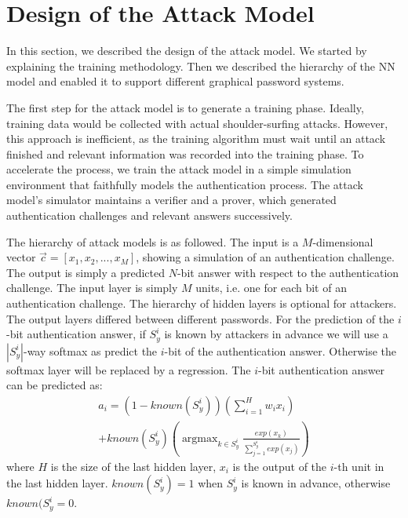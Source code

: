 \documentclass{article}
\begin{document}
  
  \section{Design of the Attack Model}
  \label{sec:design}
  In this section, we described the design of the attack model. We started by explaining the training 
  methodology. Then we described the hierarchy of the NN model and enabled it to support different graphical 
  password systems.
  
  The first step for the attack model is to generate a training phase. Ideally, training data would be collected with actual 
  shoulder-surfing attacks. However, this approach is inefficient, as the training algorithm must wait until an attack 
  finished and relevant information was recorded into the training phase. To accelerate the process, we train 
  the attack model in a simple simulation environment that faithfully models the authentication process. The 
  attack model's simulator maintains a verifier and a prover, which generated authentication challenges and 
  relevant answers successively.
  
  The hierarchy of attack models is as followed. The input is a $M$-dimensional vector 
  $\vec c = [x_1, x_2,...,x_M]$, showing a simulation of an authentication challenge. The output is simply a 
  predicted $N$-bit answer with respect to the authentication challenge. The input layer is simply $M$ units, 
  i.e. one for each bit of an authentication challenge. The hierarchy of hidden layers is optional for 
  attackers. The output layers differed between different passwords. For the prediction of the $i$-bit authentication 
  answer, if $S_y^i$ is known by attackers in advance we will use a $|S_y^i|$-way softmax as predict the $i$-bit 
  of the authentication answer. Otherwise the softmax layer will be replaced by a regression. The $i$-bit 
  authentication answer can be predicted as:
  \begin{equation}
    \begin{gathered}
    a_i = (1-known(S_y^i))(\sum_{i=1}^H w_ix_i) \\
    + known(S_y^i)(\mathop{\arg\max}_{k \in S_y^i}\frac{exp(x_k)}{\sum_{j=1}^{S_y^i}exp(x_j)})
    \end{gathered}
  \end{equation}
  where $H$ is the size of the last hidden layer, $x_i$ is the output of the $i$-th unit in the last hidden layer. 
  $known(S_y^i) = 1$ when $S_y^i$ is known in advance, otherwise $known(S_y^i = 0$.
  
\end{document}
